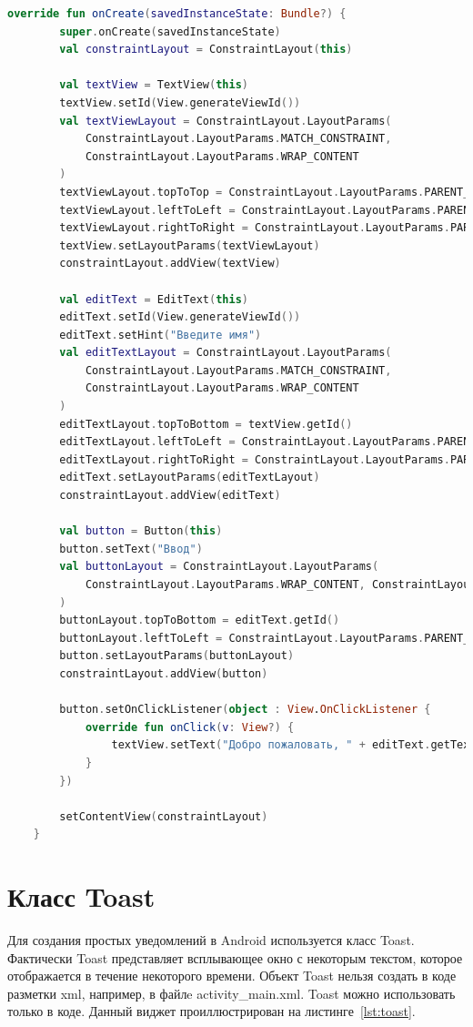 \begin{lstlisting}[language=Kotlin, caption=\leftline{buttonKotlin}, label=lst:buttonKotlin]
override fun onCreate(savedInstanceState: Bundle?) {
        super.onCreate(savedInstanceState)
        val constraintLayout = ConstraintLayout(this)

        val textView = TextView(this)
        textView.setId(View.generateViewId())
        val textViewLayout = ConstraintLayout.LayoutParams(
            ConstraintLayout.LayoutParams.MATCH_CONSTRAINT,
            ConstraintLayout.LayoutParams.WRAP_CONTENT
        )
        textViewLayout.topToTop = ConstraintLayout.LayoutParams.PARENT_ID
        textViewLayout.leftToLeft = ConstraintLayout.LayoutParams.PARENT_ID
        textViewLayout.rightToRight = ConstraintLayout.LayoutParams.PARENT_ID
        textView.setLayoutParams(textViewLayout)
        constraintLayout.addView(textView)

        val editText = EditText(this)
        editText.setId(View.generateViewId())
        editText.setHint("Введите имя")
        val editTextLayout = ConstraintLayout.LayoutParams(
            ConstraintLayout.LayoutParams.MATCH_CONSTRAINT,
            ConstraintLayout.LayoutParams.WRAP_CONTENT
        )
        editTextLayout.topToBottom = textView.getId()
        editTextLayout.leftToLeft = ConstraintLayout.LayoutParams.PARENT_ID
        editTextLayout.rightToRight = ConstraintLayout.LayoutParams.PARENT_ID
        editText.setLayoutParams(editTextLayout)
        constraintLayout.addView(editText)

        val button = Button(this)
        button.setText("Ввод")
        val buttonLayout = ConstraintLayout.LayoutParams(
            ConstraintLayout.LayoutParams.WRAP_CONTENT, ConstraintLayout.LayoutParams.WRAP_CONTENT
        )
        buttonLayout.topToBottom = editText.getId()
        buttonLayout.leftToLeft = ConstraintLayout.LayoutParams.PARENT_ID
        button.setLayoutParams(buttonLayout)
        constraintLayout.addView(button)

        button.setOnClickListener(object : View.OnClickListener {
            override fun onClick(v: View?) {
                textView.setText("Добро пожаловать, " + editText.getText())
            }
        })

        setContentView(constraintLayout)
    }
\end{lstlisting}



\section{Класс Toast}
Для создания простых уведомлений в Android используется класс 
Toast. Фактически Toast представляет всплывающее окно с некоторым 
текстом, которое отображается в течение некоторого времени. Объект Toast 
нельзя создать в коде разметки xml, например, в файлe activity\_main.xml. 
Toast можно использовать только в коде.
Данный виджет проиллюстрирован на листинге~\ref{lst:toast}.

